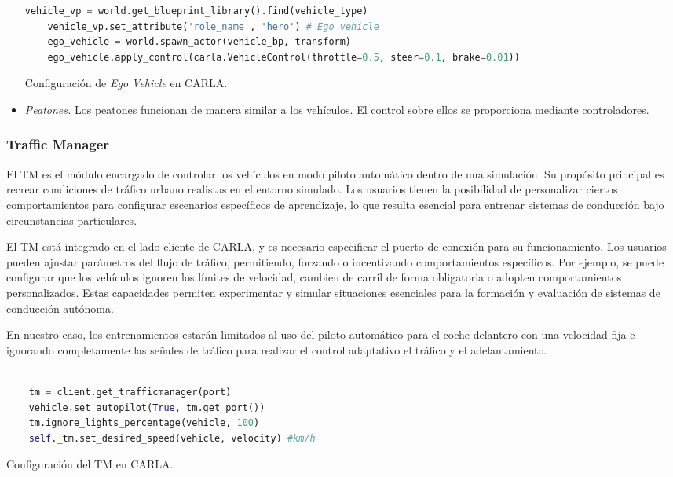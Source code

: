 \begin{itemize}
\begin{code}[h]
\begin{lstlisting}[language=python]
	vehicle_vp = world.get_blueprint_library().find(vehicle_type)
	vehicle_vp.set_attribute('role_name', 'hero') # Ego vehicle
	ego_vehicle = world.spawn_actor(vehicle_bp, transform)
	ego_vehicle.apply_control(carla.VehicleControl(throttle=0.5, steer=0.1, brake=0.01))

	\end{lstlisting}
	\caption[Configuración de \textit{Ego Vehicle} en CARLA]{Configuración de \textit{Ego Vehicle} en CARLA.}
	\label{cod:ego_carla}
	\end{code}
    \item \textit{Peatones.} Los peatones funcionan de manera similar a los vehículos. El control sobre ellos se proporciona mediante controladores.
\end{itemize}

\subsubsection{Traffic Manager}

El \ac{TM} es el módulo encargado de controlar los vehículos en modo piloto automático dentro de una simulación. Su propósito principal es recrear condiciones de tráfico urbano realistas en el entorno simulado. Los usuarios tienen la posibilidad de personalizar ciertos comportamientos para configurar escenarios específicos de aprendizaje, lo que resulta esencial para entrenar sistemas de conducción bajo circunstancias particulares.

El \ac{TM} está integrado en el lado cliente de CARLA, y es necesario especificar el puerto de conexión para su funcionamiento. Los usuarios pueden ajustar parámetros del flujo de tráfico, permitiendo, forzando o incentivando comportamientos específicos. Por ejemplo, se puede configurar que los vehículos ignoren los límites de velocidad, cambien de carril de forma obligatoria o adopten comportamientos personalizados. Estas capacidades permiten experimentar y simular situaciones esenciales para la formación y evaluación de sistemas de conducción autónoma.

En nuestro caso, los entrenamientos estarán limitados al uso del piloto automático para el coche delantero con una velocidad fija e ignorando completamente las señales de tráfico para realizar el control adaptativo el tráfico y el adelantamiento. 
\begin{code}[h]
	\begin{lstlisting}[language=python]
	
	tm = client.get_trafficmanager(port)
	vehicle.set_autopilot(True, tm.get_port())  
	tm.ignore_lights_percentage(vehicle, 100) 
	self._tm.set_desired_speed(vehicle, velocity) #km/h
\end{lstlisting}
\caption[Configuración del \ac{TM} en CARLA]{Configuración del \ac{TM} en CARLA.}
\label{cod:tm_carla}
\end{code}










